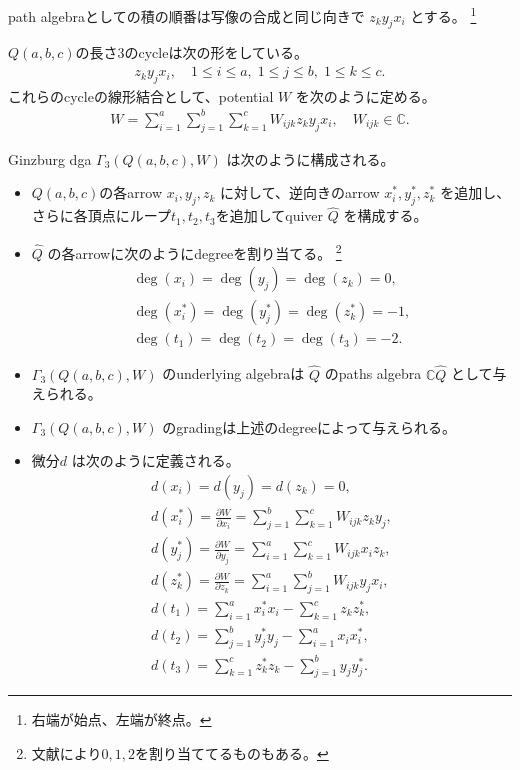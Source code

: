 \documentclass[uplatex,12pt,dvipdfmx]{jsarticle}
\theoremstyle{definition}
\numberwithin{equation}{section}
\newcommand{\Complex}{\mathbb{C}}
\begin{document}
path algebraとしての積の順番は写像の合成と同じ向きで $z_k y_j x_i$ とする。
\footnote{
	右端が始点、左端が終点。
}

$Q(a,b,c)$の長さ$3$のcycleは次の形をしている。
\begin{align}
	z_k y_j x_i, \quad 1\le i \le a, \; 1\le j \le b, \; 1\le k \le c.
\end{align}
これらのcycleの線形結合として、potential $W$ を次のように定める。
\begin{align}
	W = \sum_{i=1}^a \sum_{j=1}^b \sum_{k=1}^c W_{ijk} z_k y_j x_i, \quad W_{ijk} \in \Complex.
\end{align}

Ginzburg dga $\Gamma_3(Q(a,b,c), W)$ は次のように構成される。
\begin{itemize}
	\item $Q(a,b,c)$の各arrow $x_i,y_j,z_k$ に対して、逆向きのarrow $x_i^*,y_j^*,z_k^*$ を追加し、さらに各頂点にループ$t_1,t_2,t_3$を追加してquiver $\hat{Q}$ を構成する。
	\item $\hat{Q}$ の各arrowに次のようにdegreeを割り当てる。
	\footnote{
		文献により$0,1,2$を割り当ててるものもある。
	}
	\begin{gather}
		\deg(x_i) = \deg(y_j) = \deg(z_k) = 0, \\
		\deg(x_i^*) = \deg(y_j^*) = \deg(z_k^*) = -1, \\
		\deg(t_1) = \deg(t_2) = \deg(t_3) = -2.
	\end{gather}
	\item $\Gamma_3(Q(a,b,c), W)$ のunderlying algebraは $\hat{Q}$ のpaths algebra $\Complex \hat{Q}$ として与えられる。
	\item $\Gamma_3(Q(a,b,c), W)$ のgradingは上述のdegreeによって与えられる。
	\item 微分$d$ は次のように定義される。
	\begin{gather}
		d(x_i) = d(y_j) = d(z_k) = 0, \\
		d(x_i^*) = \frac{\partial W}{\partial x_i} = \sum_{j=1}^b \sum_{k=1}^c W_{ijk} z_k y_j, \\
		d(y_j^*) = \frac{\partial W}{\partial y_j} = \sum_{i=1}^a \sum_{k=1}^c W_{ijk} x_i z_k, \\
		d(z_k^*) = \frac{\partial W}{\partial z_k} = \sum_{i=1}^a \sum_{j=1}^b W_{ijk} y_j x_i, \\
		d(t_1) = \sum_{i=1}^a x_i^* x_i - \sum_{k=1}^c z_k z_k^*, \\
		d(t_2) = \sum_{j=1}^b y_j^* y_j - \sum_{i=1}^a x_i x_i^*, \\
		d(t_3) = \sum_{k=1}^c z_k^* z_k - \sum_{j=1}^b y_j y_j^*.
	\end{gather}
\end{itemize}
\end{document}
